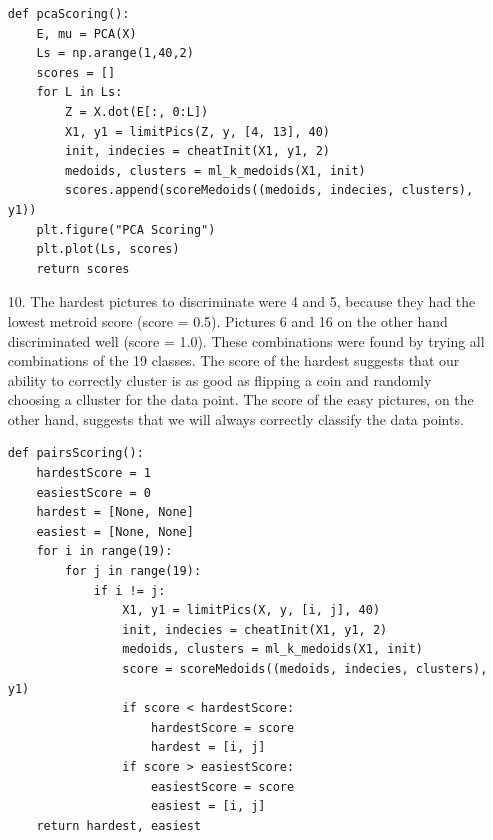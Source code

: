\documentclass{article}
\begin{document}
\begin{enumerate}
\begin{lstlisting}   
def pcaScoring():
    E, mu = PCA(X)
    Ls = np.arange(1,40,2)
    scores = []
    for L in Ls:
        Z = X.dot(E[:, 0:L])
        X1, y1 = limitPics(Z, y, [4, 13], 40)
        init, indecies = cheatInit(X1, y1, 2)
        medoids, clusters = ml_k_medoids(X1, init)
        scores.append(scoreMedoids((medoids, indecies, clusters), y1))
    plt.figure("PCA Scoring") 
    plt.plot(Ls, scores)
    return scores
\end{lstlisting}

\newpage

\item[10.]
	The hardest pictures to discriminate were 4 and 5, because they had the lowest metroid score (score = 0.5). Pictures 6 and 16 on the other hand discriminated well (score = 1.0). These combinations were found by trying all combinations of the 19 classes. The score of the hardest suggests that our ability to correctly cluster is as good as flipping a coin and randomly choosing a clluster for the data point. The score of the easy pictures, on the other hand, suggests that we will always correctly classify the data points. 

\bigskip

\begin{lstlisting}   
def pairsScoring():
    hardestScore = 1
    easiestScore = 0
    hardest = [None, None]
    easiest = [None, None]
    for i in range(19):
        for j in range(19): 
            if i != j:       
                X1, y1 = limitPics(X, y, [i, j], 40)
                init, indecies = cheatInit(X1, y1, 2)
                medoids, clusters = ml_k_medoids(X1, init)
                score = scoreMedoids((medoids, indecies, clusters), y1)
                if score < hardestScore:
                    hardestScore = score
                    hardest = [i, j]
                if score > easiestScore:
                    easiestScore = score
                    easiest = [i, j]                
    return hardest, easiest
\end{lstlisting}

\end{enumerate}
\end{document}
